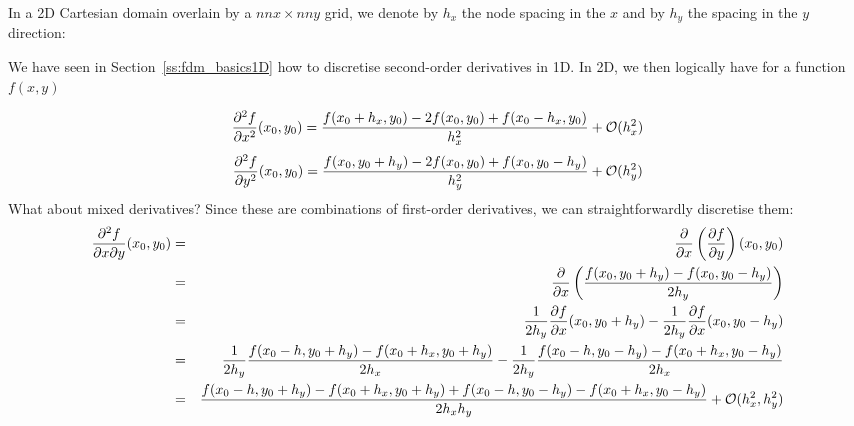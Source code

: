 
In a 2D Cartesian domain overlain by a $nnx \times nny$ grid, 
we denote by $h_x$ the node spacing in the $x$ and by $h_y$ the spacing in 
the $y$ direction:

\begin{center}

\end{center}

We have seen in Section~\ref{ss:fdm_basics1D} how to discretise second-order derivatives in 1D. 
In 2D, we then logically have for a function $f(x,y)$

\begin{equation}
\frac{\partial^2 f}{\partial x^2}(x_0,y_0) = \frac{f(x_0+h_x,y_0) -2f(x_0,y_0) + f(x_0-h_x,y_0) }{h_x^2} 
+ {\cal O}(h_x^2)
\end{equation}
\begin{equation}
\frac{\partial^2 f}{\partial y^2}(x_0,y_0) = \frac{f(x_0,y_0+h_y) -2f(x_0,y_0) + f(x_0,y_0-h_y) }{h_y^2} 
+ {\cal O}(h_y^2)
\end{equation}
What about mixed derivatives? Since these are combinations of first-order derivatives, 
we can straightforwardly discretise them:
\begin{eqnarray}
\frac{\partial^2 f }{\partial x \partial y}(x_0,y_0) 
&=& \frac{\partial }{\partial x} \left(\frac{\partial f}{\partial y}\right) (x_0,y_0) \nonumber\\
&=& \frac{\partial }{\partial x} \left(\frac{ f(x_0,y_0+h_y)-f(x_0,y_0-h_y)}{2h_y} \right) \nonumber\\
&=& \frac{1}{2h_y} \frac{\partial f}{\partial x} (x_0,y_0+h_y)
   -\frac{1}{2h_y} \frac{\partial f}{\partial x} (x_0,y_0-h_y) \nonumber\\
&=& \frac{1}{2h_y}  \frac{ f(x_0-h,y_0+h_y)-f(x_0+h_x,y_0+h_y)}{2h_x} 
-   \frac{1}{2h_y}  \frac{ f(x_0-h,y_0-h_y)-f(x_0+h_x,y_0-h_y)}{2h_x}  \nonumber\\
&=& \frac{f(x_0-h,y_0+h_y)-f(x_0+h_x,y_0+h_y) + f(x_0-h,y_0-h_y)-f(x_0+h_x,y_0-h_y)}{2 h_x h_y}
+ {\cal O}(h_x^2,h_y^2) \nonumber
\end{eqnarray}

